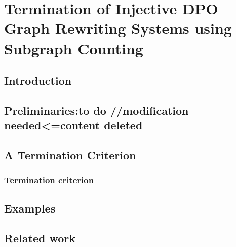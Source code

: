 \documentclass{report}
\begin{document}
\chapter{Termination of Injective DPO Graph Rewriting
Systems using Subgraph Counting}
\label{chap:subgraph_counting}
\section{Introduction}
\label{sec:intro}

\section{Preliminaries:to do //modification needed<=content deleted} 
\label{sec:pre} 
% 

% 

% 
   
\section{A Termination Criterion} 
\label{sec:termination_criterion}
 
 
\subsection{Termination criterion}
\label{sec:termination} 

 

\section{Examples}
\label{sec:examples}


  
\section{Related work}
\label{sec:related_work} 

\end{document}
